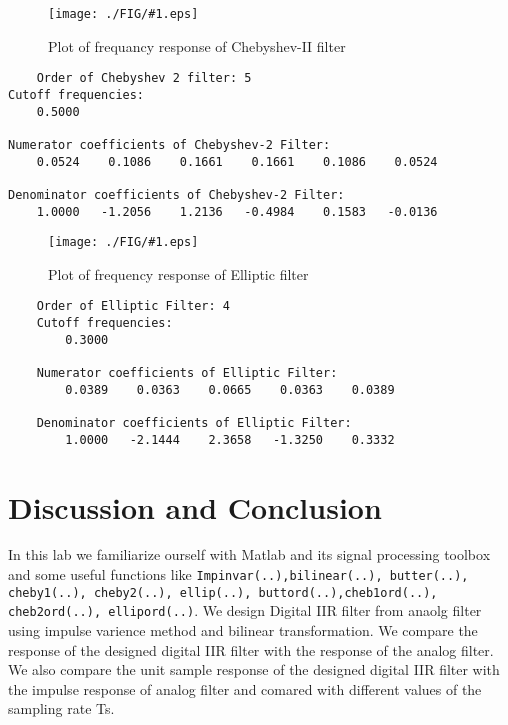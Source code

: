 \documentclass[a4paper,11pt]{article}
\newcommand{\mobs}[2]{
    \begin{figure}[H]
        \centering
        \texttt{[image: ./FIG/\#1.eps]}
        \caption{#2}
    \end{figure}
   
}
\begin{document}
\mobs{p4c}{Plot of frequancy response of Chebyshev-II filter}
\begin{verbatim}
    Order of Chebyshev 2 filter: 5
Cutoff frequencies:
    0.5000

Numerator coefficients of Chebyshev-2 Filter: 
    0.0524    0.1086    0.1661    0.1661    0.1086    0.0524

Denominator coefficients of Chebyshev-2 Filter: 
    1.0000   -1.2056    1.2136   -0.4984    0.1583   -0.0136

\end{verbatim}

\mobs{p4d}{Plot of frequency response of Elliptic filter}
\begin{verbatim}
    Order of Elliptic Filter: 4
    Cutoff frequencies:
        0.3000
    
    Numerator coefficients of Elliptic Filter: 
        0.0389    0.0363    0.0665    0.0363    0.0389
    
    Denominator coefficients of Elliptic Filter: 
        1.0000   -2.1444    2.3658   -1.3250    0.3332 
\end{verbatim}



\section{Discussion and Conclusion}
In this lab we familiarize ourself with Matlab and its signal processing toolbox and some useful functions like \texttt{Impinvar(..),bilinear(..), butter(..), cheby1(..), cheby2(..), ellip(..), buttord(..),cheb1ord(..), cheb2ord(..), ellipord(..)}. We design Digital IIR filter from anaolg filter using impulse varience method and bilinear transformation. We compare the response of the designed digital IIR filter with the response of the analog filter. We also compare the unit sample response of the designed digital IIR filter with the impulse response of analog filter and comared with different values of the sampling rate Ts.
\end{document}

